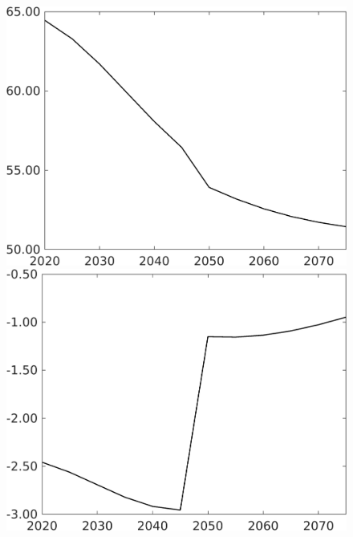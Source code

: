 \documentclass[12pt]{article}
\begin{document}
\begin{figure}[h!!]
\begin{minipage}[]{0.32\textwidth}
	\end{minipage}		
	\begin{minipage}[]{0.32\textwidth}
		\includegraphics[width=1\textwidth]{../../codding_model/own_basedOnFried/optimalPol_010922_revision/figures/all_13Sept22/CompTaufPER_bytaul_Equlab_Reg0_sff_spillover0_nsk0_xgr0_knspil1_sep0_LFlimit1_emsbase0_countec0_GovRev0_etaa0.79_lgd0.png}
	\end{minipage}		
	\begin{minipage}[]{0.32\textwidth}
		\includegraphics[width=1\textwidth]{../../codding_model/own_basedOnFried/optimalPol_010922_revision/figures/all_13Sept22/CompTaufPER_bytaul_Equlab_Reg0_sg_spillover0_nsk0_xgr0_knspil1_sep0_LFlimit1_emsbase0_countec0_GovRev0_etaa0.79_lgd0.png}

\end{minipage}
\end{figure}
\end{document}
